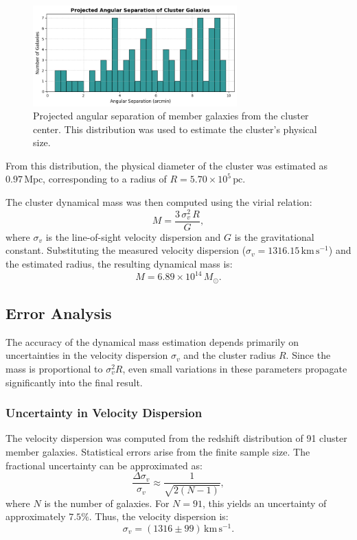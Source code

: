 \documentclass[12pt]{article}
\begin{document}
\begin{figure}[H]
    \centering
    \includegraphics[width=0.7\textwidth]{cluster_radius.png}
    \caption{Projected angular separation of member galaxies from the cluster center.
    This distribution was used to estimate the cluster's physical size.}
    \label{fig:radius}
\end{figure}

From this distribution, the physical diameter of the cluster was estimated as 
$0.97 \,\mathrm{Mpc}$, corresponding to a radius of 
$R = 5.70 \times 10^5 \,\mathrm{pc}$. 

The cluster dynamical mass was then computed using the virial relation:
\begin{equation}
    M = \frac{3 \, \sigma_v^2 \, R}{G},
\end{equation}
where $\sigma_v$ is the line-of-sight velocity dispersion and $G$ is the gravitational constant. 
Substituting the measured velocity dispersion 
($\sigma_v = 1316.15 \,\mathrm{km \, s^{-1}}$) and the estimated radius, 
the resulting dynamical mass is:
\[
    M = 6.89 \times 10^{14} \, M_{\odot}.
\]
\subsection{Error Analysis}
The accuracy of the dynamical mass estimation depends primarily on uncertainties 
in the velocity dispersion $\sigma_v$ and the cluster radius $R$. Since the mass 
is proportional to $\sigma_v^2 R$, even small variations in these parameters 
propagate significantly into the final result. 

\subsubsection*{Uncertainty in Velocity Dispersion}
The velocity dispersion was computed from the redshift distribution of 
91 cluster member galaxies. Statistical errors arise from the finite sample size. 
The fractional uncertainty can be approximated as:
\[
    \frac{\Delta \sigma_v}{\sigma_v} \approx \frac{1}{\sqrt{2(N-1)}},
\]
where $N$ is the number of galaxies. For $N = 91$, this yields an uncertainty 
of approximately $7.5\%$. Thus, the velocity dispersion is:
\[
    \sigma_v = (1316 \pm 99) \,\mathrm{km \, s^{-1}}.
\]
\end{document}
